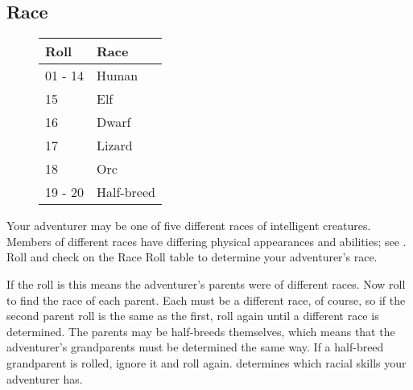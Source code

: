 \begin{multicols*}{2}
\section{Race}
\begin{wrapfigure}[9]{l}[0pt]{85pt}
\begin{normbox}
\small
\begin{tabular}{@{}l l}
\textbf{Roll} & \textbf{Race}\\
\midrule
01 - 14 & Human\\
15 & Elf\\
16 & Dwarf \\
17 & Lizard\\
18 & Orc\\
19 - 20 & Half-breed
\end{tabular}
\end{normbox}\smallskip
\end{wrapfigure}
Your adventurer may be one of five different races of intelligent creatures. Members of different races have differing physical appearances and abilities; see . Roll  and check on the Race Roll table to determine your adventurer's race.

If the roll is  this means the adventurer's parents were of different races. Now roll to find the race of each parent. Each must be a different race, of course, so if the second parent roll is the same as the first, roll again until a different race is determined. The parents may be half-breeds themselves, which means that the adventurer's grandparents must be determined the same way. If a half-breed grandparent is rolled, ignore it and roll again.  determines which racial skills your adventurer has. 


\end{multicols*}
